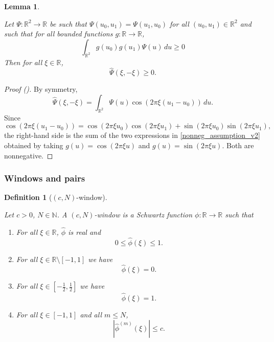 \documentclass[12pt,reqno]{amsart}
\newcommand{\auto}{{({\tiny\faCar})}}
\theoremstyle{plain}
\newtheorem{lemma}[theorem]{Lemma}
\newtheorem{definition}[theorem]{Definition}
\numberwithin{equation}{section}
\theoremstyle{remark}
\newcommand{\uses}[1]{}
\newcommand{\usesdefs}[1]{}
\newcommand{\leanok}{}
\newcommand{\lean}[1]{}
\newcommand{\R}{{\mathbb R}}
\begin{document}
\begin{lemma}\label{lem:Phipos_v2}\uses{}\usesdefs{}
\lean{Auto.phiPosV2}
\leanok
Let
$\Psi:\mathbb{R}^2\to \mathbb{R}$ be such   that $\Psi(u_0,u_1)=\Psi(u_1,u_0)$ for all $(u_0,u_1)\in \R^2$ and such that
for all bounded functions $g:\R\to\R$,
\begin{equation}\label{nonneg_assumption_v2}
    \int_{\R^2} g(u_0){g(u_1)} \Psi(u)\,du \ge 0
\end{equation}
Then for all $\xi\in \R$, \begin{equation}\label{auto:positive-kernel-diagonal-Fourier}\widehat{\Psi}(\xi,-\xi)\geq 0.\end{equation}
\end{lemma}
\begin{proof}[Proof \auto]
By symmetry,
\[
\widehat\Psi(\xi,-\xi)
=
\int_{\R^2}\Psi(u)
\cos(2\pi\xi(u_1-u_0))\,du.
\]
Since
\[
\cos(2\pi\xi(u_1-u_0))
=
\cos(2\pi\xi u_0)\cos(2\pi\xi u_1)
+
\sin(2\pi\xi u_0)\sin(2\pi\xi u_1),
\]
the right-hand side is the sum of the two expressions in \eqref{nonneg_assumption_v2} obtained by taking $g(u)=\cos(2\pi\xi u)$ and $g(u)=\sin(2\pi\xi u)$. Both are nonnegative.
\end{proof}


\subsubsection{Windows and pairs}\label{sec:windows}
\begin{definition}[$(c,N)$-window]\label{def:cn-window}\uses{}\usesdefs{}
\lean{Auto.cnWindow}
Let $c > 0$, $N\in\mathbb{N}$. A {\em $(c,N)$-window} is a Schwartz function $\phi:\R\to\R$ such that
\begin{enumerate}
\item For all $\xi\in \R$, $\widehat{\phi}$ is real and
\begin{equation}\label{auto:window-Fourier-range}0\le \widehat{\phi}(\xi)\le 1.\end{equation}
\item For all $\xi\in \R\setminus [-1,1]$ we have
\begin{equation}\label{ft_window_eq_zero}
\widehat{\phi}(\xi)=0.
\end{equation}
\item For all $\xi\in   [-\frac12,\frac12]$ we have
\begin{equation}\label{ft_window_eq_one}
\widehat{\phi}(\xi)=1.
\end{equation}
\item For all $\xi \in [-1,1]$ and all $m\le N$,
\begin{equation}\label{windowbound}
|\widehat{\phi}^{(m)}(\xi)| \leq c.
\end{equation}
\end{enumerate}
\end{definition}
\end{document}
